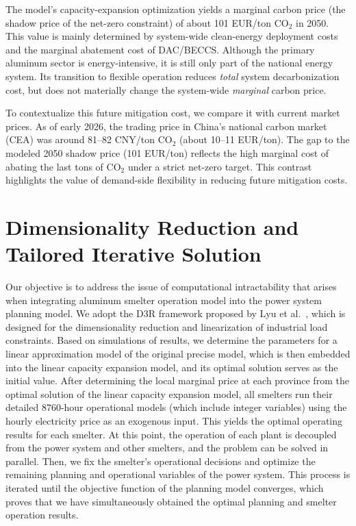 \documentclass[preprint,12pt]{elsarticle}
\begin{document}
The model's capacity-expansion optimization yields a marginal carbon price (the shadow price of the net-zero constraint) of about 101 EUR/ton CO$_2$ in 2050. This value is mainly determined by system-wide clean-energy deployment costs and the marginal abatement cost of DAC/BECCS. Although the primary aluminum sector is energy-intensive, it is still only part of the national energy system. Its transition to flexible operation reduces \textit{total} system decarbonization cost, but does not materially change the system-wide \textit{marginal} carbon price.

To contextualize this future mitigation cost, we compare it with current market prices. As of early 2026, the trading price in China's national carbon market (CEA) was around 81--82 CNY/ton CO$_2$ (about 10--11 EUR/ton). The gap to the modeled 2050 shadow price (101 EUR/ton) reflects the high marginal cost of abating the last tons of CO$_2$ under a strict net-zero target. This contrast highlights the value of demand-side flexibility in reducing future mitigation costs.




\newpage
\section{Dimensionality Reduction and Tailored Iterative Solution}

Our objective is to address the issue of computational intractability that arises when integrating aluminum smelter operation model 
into the power system planning model. We adopt the D3R framework proposed by Lyu et al.~\citep{lyu_data-driven_2025}, which is 
designed for the dimensionality reduction and linearization of industrial load constraints. Based on simulations of results, we 
determine the parameters for a linear approximation model of the original precise model, which is then embedded into the linear 
capacity expansion model, and its optimal solution serves as the initial value. After determining the local marginal price at each 
province from the optimal solution of the linear capacity expansion model, all smelters run their detailed 8760-hour operational 
models (which include integer variables) using the hourly electricity price as an exogenous input. This yields the optimal operating 
results for each smelter. At this point, the operation of each plant is decoupled from the power system and other smelters, and the 
problem can be solved in parallel. Then, we fix the smelter's operational decisions and optimize the remaining planning and 
operational variables of the power system. This process is iterated until the objective function of the planning 
model converges, which proves that we have simultaneously obtained the optimal planning and smelter operation results.
\end{document}
